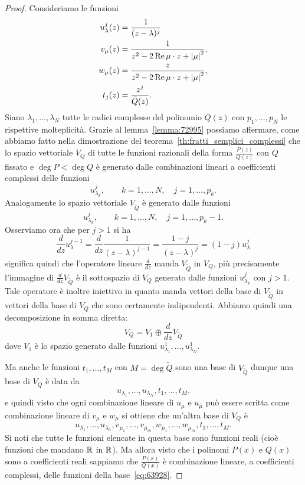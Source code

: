 \begin{proof}
Consideriamo le funzioni
\begin{align*}
   u_\lambda^j(z) &= \frac{1}{(z-\lambda)^j}\\
   v_\mu(z) &= \frac{1}{z^2-2 \operatorname{Re} \mu\cdot z + {\left|\mu\right|}^2},\\
   w_\mu(z) &= \frac{z}{z^2-2 \operatorname{Re} \mu\cdot z + {\left|\mu\right|}^2},\\
   t_j(z) &= \frac{z^j}{\tilde Q(z)}.
\end{align*}
Siano $\lambda_1, \dots, \lambda_N$ tutte le radici
complesse del polinomio $Q(z)$ con $p_1, \dots, p_N$
le rispettive molteplicità.
Grazie al lemma~\ref{lemma:72995} possiamo affermare,
come abbiamo fatto nella dimostrazione del
teorema~\ref{th:fratti_semplici_complessi} che lo
spazio vettoriale $V_Q$ di tutte le funzioni
razionali della forma $\frac{P(z)}{Q(z)}$
con $Q$ fissato e $\deg P<\deg Q$
è generato dalle combinazioni lineari
a coefficienti complessi delle funzioni
\[
  u_{\lambda_k}^j, \qquad k=1, \dots, N, \quad j=1, \dots, p_k.
\]
Analogamente lo spazio vettoriale $V_{\tilde Q}$
è generato dalle funzioni
\[
  u_{\lambda_k}^j, \qquad k=1, \dots, N, \quad j=1, \dots, p_k-1.
\]
Osserviamo ora che per $j>1$ si ha
\[
 \frac {d}{dz} u_\lambda^{j-1} =
 \frac {d}{dz} \frac{1}{(z-\lambda)^{j-1}}
 = \frac{1-j}{(z-\lambda)^j} = (1-j) u_\lambda^j
\]
significa quindi che l'operatore lineare $\frac d {dz}$
manda $V_{\tilde Q}$ in $V_Q$, più precisamente
l'immagine di $\frac{d}{dz} V_{\tilde Q}$ è il sottospazio
di $V_Q$ generato dalle funzioni $u_{\lambda_k}^j$
con $j>1$. Tale operatore
è inoltre iniettivo in quanto manda vettori della
base di $V_{\tilde Q}$ in vettori della base di $V_Q$
che sono certamente indipendenti.
Abbiamo quindi una decomposizione in somma diretta:
\[
  V_Q = V_1 \oplus \frac{d}{dz} V_{\tilde Q}
\]
dove $V_1$ è lo spazio generato
dalle funzioni $u_{\lambda_1}^1, \dots, u_{\lambda_N}^1$.

Ma anche le funzioni $t_1, \dots, t_M$ con $M=\deg \tilde Q$
sono una base di $V_{\tilde Q}$ dunque una base
di $V_Q$ è data da
\[
  u_{\lambda_1}, \dots, u_{\lambda_N},
  t_1, \dots, t_M.
\]
e quindi visto che ogni combinazione lineare
di $u_{\mu}$ e $u_{\bar \mu}$ può essere scritta
come combinazione lineare di $v_\mu$ e $w_\mu$
si ottiene che un'altra base di $V_Q$ è
\begin{equation}\label{eq:63928}
  u_{\lambda_1}, \dots, u_{\lambda_n},
  v_{\mu_1}, \dots, v_{\mu_m},
  w_{\mu_1}, \dots, w_{\mu_m},
  t_1, \dots, t_M.
\end{equation}
Si noti che tutte le funzioni elencate in questa
base sono funzioni reali (cioè funzioni che mandano
$\mathbb R$ in $\mathbb R$).
Ma allora visto che i polinomi $P(x)$ e $Q(x)$ sono
a coefficienti reali sappiamo che $\frac{P(x)}{Q(x)}$
è combinazione lineare, a coefficienti complessi,
delle funzioni della base~\eqref{eq:63928}.



\end{proof}
